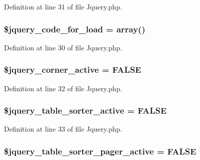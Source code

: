 Definition at line 31 of file Jquery.\-php.

\hypertarget{class_c_i___jquery_aae273040292e1e032140a014d38f6f0c}{
\subsubsection[{\$jquery\-\_\-code\-\_\-for\-\_\-load}]{\setlength{\rightskip}{0pt plus 5cm}\$jquery\-\_\-code\-\_\-for\-\_\-load = array()}}\label{class_c_i___jquery_aae273040292e1e032140a014d38f6f0c}


Definition at line 30 of file Jquery.\-php.

\hypertarget{class_c_i___jquery_a86584cd6fadb4fe08bc8cf65d98da4f3}{
\subsubsection[{\$jquery\-\_\-corner\-\_\-active}]{\setlength{\rightskip}{0pt plus 5cm}\$jquery\-\_\-corner\-\_\-active = F\-A\-L\-S\-E}}\label{class_c_i___jquery_a86584cd6fadb4fe08bc8cf65d98da4f3}


Definition at line 32 of file Jquery.\-php.

\hypertarget{class_c_i___jquery_a29e31c754cf116ca8fb50756b582f3a9}{
\subsubsection[{\$jquery\-\_\-table\-\_\-sorter\-\_\-active}]{\setlength{\rightskip}{0pt plus 5cm}\$jquery\-\_\-table\-\_\-sorter\-\_\-active = F\-A\-L\-S\-E}}\label{class_c_i___jquery_a29e31c754cf116ca8fb50756b582f3a9}


Definition at line 33 of file Jquery.\-php.

\hypertarget{class_c_i___jquery_a43cc145aba3c11e907fb4245f23bc44e}{
\subsubsection[{\$jquery\-\_\-table\-\_\-sorter\-\_\-pager\-\_\-active}]{\setlength{\rightskip}{0pt plus 5cm}\$jquery\-\_\-table\-\_\-sorter\-\_\-pager\-\_\-active = F\-A\-L\-S\-E}}\label{class_c_i___jquery_a43cc145aba3c11e907fb4245f23bc44e}


